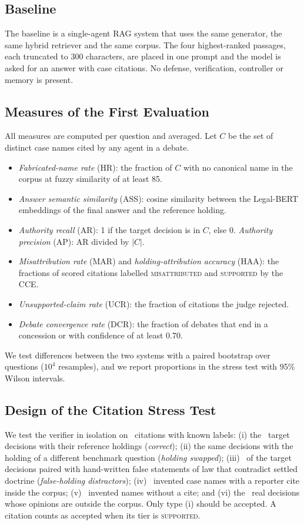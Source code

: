\documentclass[conference]{IEEEtran}
\begin{document}
\subsection{Baseline}
The baseline is a single-agent RAG system that uses the same generator, the same hybrid retriever and the same corpus. The four highest-ranked passages, each truncated to 300 characters, are placed in one prompt and the model is asked for an answer with case citations. No defense, verification, controller or memory is present.

\subsection{Measures of the First Evaluation}
All measures are computed per question and averaged. Let $C$ be the set of distinct case names cited by any agent in a debate.
\begin{itemize}
\item \emph{Fabricated-name rate} (HR): the fraction of $C$ with no canonical name in the corpus at fuzzy similarity of at least 85.
\item \emph{Answer semantic similarity} (ASS): cosine similarity between the Legal-BERT embeddings of the final answer and the reference holding.
\item \emph{Authority recall} (AR): 1 if the target decision is in $C$, else 0. \emph{Authority precision} (AP): AR divided by $|C|$.
\item \emph{Misattribution rate} (MAR) and \emph{holding-attribution accuracy} (HAA): the fractions of scored citations labelled \textsc{misattributed} and \textsc{supported} by the CCE.
\item \emph{Unsupported-claim rate} (UCR): the fraction of citations the judge rejected.
\item \emph{Debate convergence rate} (DCR): the fraction of debates that end in a concession or with confidence of at least 0.70.
\end{itemize}
We test differences between the two systems with a paired bootstrap over questions ($10^4$ resamples), and we report proportions in the stress test with 95\% Wilson intervals.

\subsection{Design of the Citation Stress Test}
We test the verifier in isolation on \ResStressTotal\ citations with known labels: (i) the \ResStressCorrectN\ target decisions with their reference holdings (\emph{correct}); (ii) the same decisions with the holding of a different benchmark question (\emph{holding swapped}); (iii) \ResStressCaseholdN\ of the target decisions paired with hand-written false statements of law that contradict settled doctrine (\emph{false-holding distractors}); (iv) \ResStressFabCiteN\ invented case names with a reporter cite inside the corpus; (v) \ResStressFabNoCiteN\ invented names without a cite; and (vi) the \ResStressOffCorpusN\ real decisions whose opinions are outside the corpus. Only type (i) should be accepted. A citation counts as accepted when its tier is \textsc{supported}.
\end{document}
